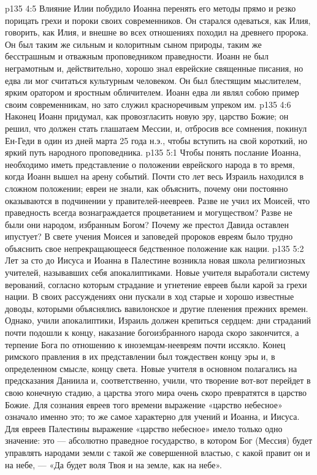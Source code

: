 \vs p135 4:5 Влияние Илии побудило Иоанна перенять его методы прямо и резко порицать грехи и пороки своих современников. Он старался одеваться, как Илия, говорить, как Илия, и внешне во всех отношениях походил на древнего пророка. Он был таким же сильным и колоритным сыном природы, таким же бесстрашным и отважным проповедником праведности. Иоанн не был неграмотным и, действительно, хорошо знал еврейские священные писания, но едва ли мог считаться культурным человеком. Он был блестящим мыслителем, ярким оратором и яростным обличителем. Иоанн едва ли являл собою пример своим современникам, но зато служил красноречивым упреком им.
\vs p135 4:6 Наконец Иоанн придумал, как провозгласить новую эру, царство Божие; он решил, что должен стать глашатаем Мессии, и, отбросив все сомнения, покинул Ен\hyp{}Геди в один из дней марта 25 года н.э., чтобы вступить на свой короткий, но яркий путь народного проповедника.
\vs p135 5:1 Чтобы понять послание Иоанна, необходимо иметь представление о положении еврейского народа в то время, когда Иоанн вышел на арену событий. Почти сто лет весь Израиль находился в сложном положении; евреи не знали, как объяснить, почему они постоянно оказываются в подчинении у правителей\hyp{}неевреев. Разве не учил их Моисей, что праведность всегда вознаграждается процветанием и могуществом? Разве не были они народом, избранным Богом? Почему же престол Давида оставлен ипустует? В свете учения Моисея и заповедей пророков евреям было трудно объяснить свое непрекращающееся бедственное положение как нации.
\vs p135 5:2 Лет за сто до Иисуса и Иоанна в Палестине возникла новая школа религиозных учителей, называвших себя апокалиптиками. Новые учителя выработали систему верований, согласно которым страдание и угнетение евреев были карой за грехи нации. В своих рассуждениях они пускали в ход старые и хорошо известные доводы, которыми объяснялись вавилонское и другие пленения прежних времен. Однако, учили апокалиптики, Израиль должен крепиться сердцем: дни страданий почти подошли к концу, наказание богоизбранного народа скоро закончится, а терпение Бога по отношению к иноземцам\hyp{}неевреям почти иссякло. Конец римского правления в их представлении был тождествен концу эры и, в определенном смысле, концу света. Новые учителя в основном полагались на предсказания Даниила и, соответственно, учили, что творение вот\hyp{}вот перейдет в свою конечную стадию, а царства этого мира очень скоро превратятся в царство Божие. Для сознания евреев того времени выражение «царство небесное» означало именно это; то же самое характерно для учений и Иоанна, и Иисуса. Для евреев Палестины выражение «царство небесное» имело только одно значение: это --- абсолютно праведное государство, в котором Бог (Мессия) будет управлять народами земли с такой же совершенной властью, с какой правит он и на небе, --- «Да будет воля Твоя и на земле, как на небе».
